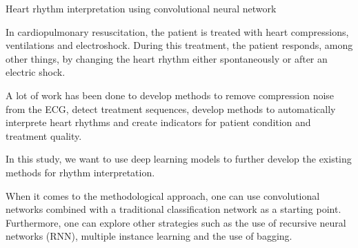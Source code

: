 Heart rhythm interpretation using convolutional neural network

In cardiopulmonary resuscitation, the patient is treated with heart compressions, ventilations and electroshock. During this treatment, the patient responds, among other things, by changing the heart rhythm either spontaneously or after an electric shock.

A lot of work has been done to develop methods to remove compression noise from the ECG, detect treatment sequences, develop methods to automatically interprete heart rhythms and create indicators for patient condition and treatment quality.

In this study, we want to use deep learning models to further develop the existing methods for rhythm interpretation.

When it comes to the methodological approach, one can use convolutional networks combined with a traditional classification network as a starting point. Furthermore, one can explore other strategies such as the use of recursive neural networks (RNN), multiple instance learning and the use of bagging.